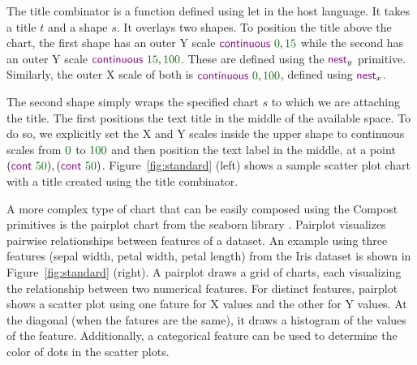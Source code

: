 \documentclass{jfp}
\newcommand{\num}[1]{\textcolor{numclr}{#1}}
\newcommand{\ident}[1]{\textnormal{\textcolor{idclr}{\sffamily #1}}}
\newcommand{\kvd}[1]{\textnormal{\textcolor{kvdclr}{\sffamily #1}}}
\newcommand{\fkvd}[1]{\textnormal{\textcolor{fkvdclr}{\sffamily #1}}}
\begin{document}
\vspace{-0.5em}
\noindent
The \ident{title} combinator is a function defined using \fkvd{let} in the host language. It takes
a title $t$ and a shape $s$. It overlays two shapes. To position the title above the chart, the first
shape has an outer Y scale $\kvd{continuous}~\num{0},\num{15}$ while the second has an outer Y scale
$\kvd{continuous}~\num{15},\num{100}$. These are defined using the $\kvd{nest}_y$ primitive. Similarly,
the outer X scale of both is $\kvd{continuous}~\num{0},\num{100}$, defined using $\kvd{nest}_x$.

The second shape simply wraps the specified chart $s$ to which we are attaching the title. The first
positions the text title in the middle of the available space. To do so, we explicitly set the X and
Y scales inside the upper shape to continuous scales from $\num{0}$ to $\num{100}$ and then position
the text label in the middle, at a point $(\kvd{cont}~\num{50}), (\kvd{cont}~\num{50})$.
Figure~\ref{fig:standard} (left) shows a sample scatter plot chart with a title created using the
\ident{title} combinator.

A more complex type of chart that can be easily composed using the Compost primitives is the
pairplot chart from the seaborn library \cite{seaborn}.
Pairplot visualizes pairwise relationships between features of a dataset.
An example using three features (sepal width, petal width, petal length) from the Iris dataset is shown
in Figure~\ref{fig:standard} (right).
A pairplot draws a grid of charts, each visualizing the relationship between two numerical features. For distinct
features, pairplot shows a scatter plot using one fature for X values and the other for Y values.
At the diagonal (when the fatures are the same), it draws a histogram of the values of the feature.
Additionally, a categorical feature can be used to determine the color of dots in the scatter plots.
\end{document}
